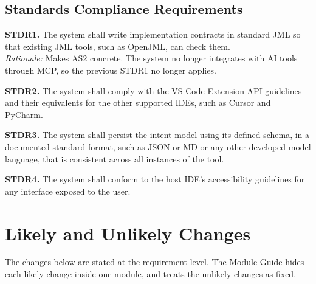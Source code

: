 \documentclass[12pt]{article}
\begin{document}
\subsection{Standards Compliance Requirements}
\medskip
\noindent\textbf{STDR1.} The system shall write implementation contracts in standard JML so that existing JML tools, such as OpenJML, can check them.\\
\textit{Rationale:} Makes AS2 concrete. The system no longer integrates with AI tools through MCP, so the previous STDR1 no longer applies.

\medskip
\noindent\textbf{STDR2.} The system shall comply with the VS Code Extension API guidelines and their equivalents for the other supported IDEs, such as Cursor and PyCharm.

\medskip
\noindent\textbf{STDR3.} The system shall persist the intent model using its defined schema, in a documented standard format, such as JSON or MD or any other developed model language, that is consistent across all instances of the tool.

\medskip
\noindent\textbf{STDR4.} The system shall conform to the host IDE's accessibility guidelines for any interface exposed to the user.

\section{Likely and Unlikely Changes}
\label{sec:changes}

The changes below are stated at the requirement level. The Module Guide hides
each likely change inside one module, and treats the unlikely changes as fixed.
\end{document}
